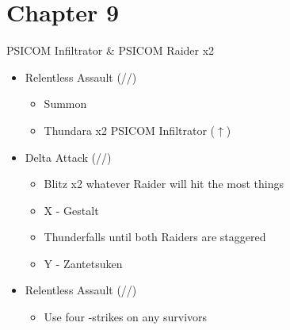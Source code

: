 \chapter{Chapter 9}
\renewcommand{\first}{[1] Relentless Assault (\rav/\rav/\com)}
\renewcommand{\second}{[2] Delta Attack (\com/\rav/\sen)}
\begin{battle}[0:18]{PSICOM Infiltrator \& PSICOM Raider x2}
	\begin{itemize}
		\item \first
		      \begin{itemize}
			      \item Summon
			      \item Thundara x2 PSICOM Infiltrator ($\uparrow$)
		      \end{itemize}
		\item \second
		      \begin{itemize}
			      \item Blitz x2 whatever Raider will hit the most things
			      \item X - Gestalt
			      \item Thunderfalls until both Raiders are staggered
			      \item Y - Zantetsuken
		      \end{itemize}
		\item \first
		      \begin{itemize}
			      \item Use four -strikes on any survivors
		      \end{itemize}
	\end{itemize}
	  
\end{battle}
\vfill
\ 
